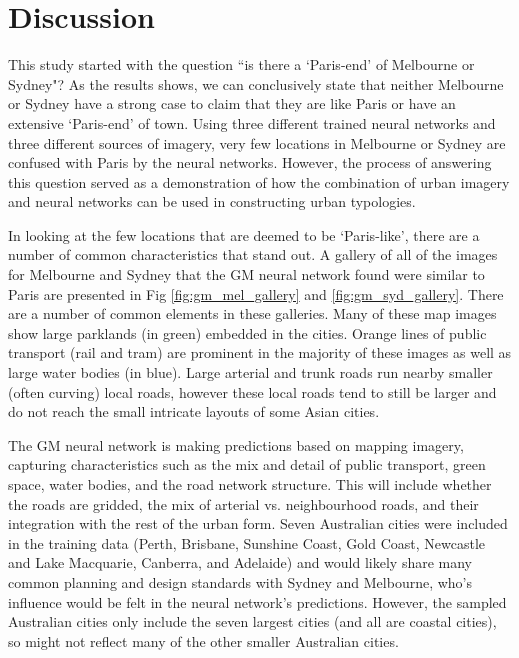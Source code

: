 \documentclass[10pt,letterpaper,hidelinks]{article}
\begin{document}
\section*{Discussion}\label{sec:discussion}
This study started with the question ``is there a `Paris-end' of Melbourne or Sydney"? As the results shows, we can conclusively state that neither Melbourne or Sydney have a strong case to claim that they are like Paris or have an extensive `Paris-end' of town. Using three different trained neural networks and three different sources of imagery, very few locations in Melbourne or Sydney are confused with Paris by the neural networks. However, the process of answering this question served as a demonstration of how the combination of urban imagery and neural networks can be used in constructing urban typologies.

In looking at the few locations that are deemed to be `Paris-like', there are a number of common characteristics that stand out. A gallery of all of the images for Melbourne and Sydney that the GM neural network found were similar to Paris are presented in Fig \ref{fig:gm_mel_gallery} and \ref{fig:gm_syd_gallery}. There are a number of common elements in these galleries. Many of these map images show large parklands (in green) embedded in the cities. Orange lines of public transport (rail and tram) are prominent in the majority of these images as well as large water bodies (in blue). Large arterial and trunk roads run nearby smaller (often curving) local roads, however these local roads tend to still be larger and do not reach the small intricate layouts of some Asian cities.

The GM neural network is making predictions based on mapping imagery, capturing characteristics such as the mix and detail of public transport, green space, water bodies, and the road network structure. This will include whether the roads are gridded, the mix of arterial vs. neighbourhood roads, and their integration with the rest of the urban form. Seven Australian cities were included in the training data (Perth, Brisbane, Sunshine Coast, Gold Coast, Newcastle and Lake Macquarie, Canberra, and Adelaide) and would likely share many common planning and design standards with Sydney and Melbourne, who's influence would be felt in the neural network's predictions. However, the sampled Australian cities only include the seven largest cities (and all are coastal cities), so might not reflect many of the other smaller Australian cities. 
\end{document}

